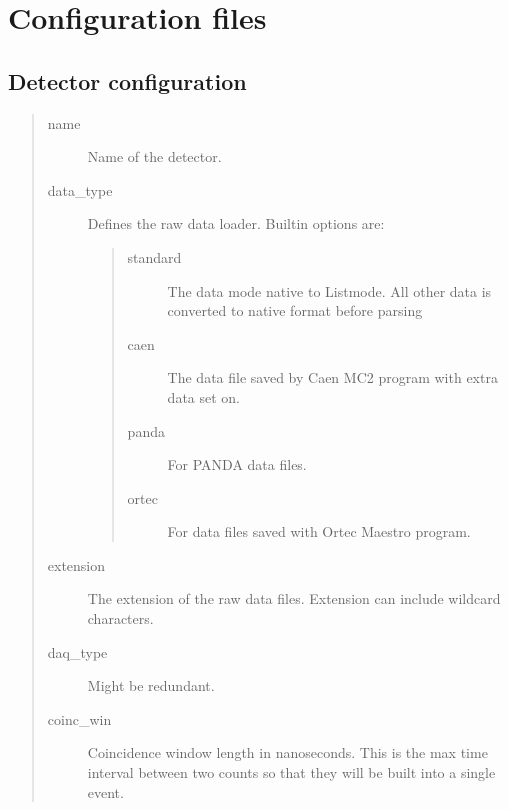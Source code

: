 \documentclass[letterpaper,10pt,english]{sphinxmanual}
\begin{document}
\chapter{Configuration files}
\label{\detokenize{manual/configuration:configuration-files}}\label{\detokenize{manual/configuration:configuration}}\label{\detokenize{manual/configuration::doc}}

\section{Detector configuration}
\label{\detokenize{manual/configuration:detector-configuration}}\begin{quote}\begin{description}
\item[{name}] \leavevmode
\sphinxAtStartPar
Name of the detector.

\item[{data\_type}] \leavevmode
\sphinxAtStartPar
Defines the raw data loader. Built\sphinxhyphen{}in options are:
\begin{quote}\begin{description}
\item[{standard}] \leavevmode
\sphinxAtStartPar
The data mode native to Listmode. All other data is converted to native
format before parsing

\item[{caen}] \leavevmode
\sphinxAtStartPar
The data file saved by Caen MC2 program with extra data set on.

\item[{panda}] \leavevmode
\sphinxAtStartPar
For PANDA data files.

\item[{ortec}] \leavevmode
\sphinxAtStartPar
For data files saved with Ortec Maestro program.

\end{description}\end{quote}

\item[{extension}] \leavevmode
\sphinxAtStartPar
The extension of the raw data files. Extension can include wildcard characters.

\item[{daq\_type}] \leavevmode
\sphinxAtStartPar
Might be redundant.

\item[{coinc\_win}] \leavevmode
\sphinxAtStartPar
Coincidence window length in nanoseconds. This is the max time interval between two
counts so that they will be built into a single event.


\end{description}
\end{quote}
\end{document}
